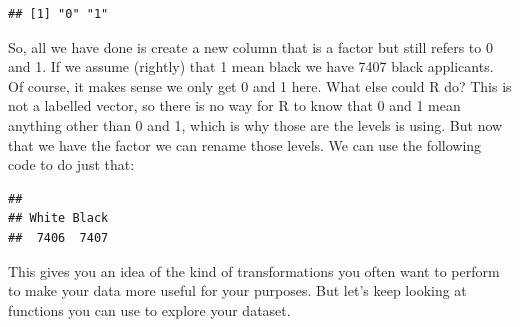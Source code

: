 \documentclass[
]{book}
\newenvironment{Shaded}{\begin{snugshade}}{\end{snugshade}}
\newcommand{\CommentTok}[1]{\textcolor[rgb]{0.56,0.35,0.01}{\textit{#1}}}
\newcommand{\FunctionTok}[1]{\textcolor[rgb]{0.00,0.00,0.00}{#1}}
\newcommand{\NormalTok}[1]{#1}
\newcommand{\OtherTok}[1]{\textcolor[rgb]{0.56,0.35,0.01}{#1}}
\newcommand{\SpecialCharTok}[1]{\textcolor[rgb]{0.00,0.00,0.00}{#1}}
\newcommand{\StringTok}[1]{\textcolor[rgb]{0.31,0.60,0.02}{#1}}
\begin{document}
\begin{Shaded}
\end{Shaded}

\begin{verbatim}
## [1] "0" "1"
\end{verbatim}

So, all we have done is create a new column that is a factor but still refers to 0 and 1. If we assume (rightly) that 1 mean black we have 7407 black applicants. Of course, it makes sense we only get 0 and 1 here. What else could R do? This is not a labelled vector, so there is no way for R to know that 0 and 1 mean anything other than 0 and 1, which is why those are the levels is using. But now that we have the factor we can rename those levels. We can use the following code to do just that:

\begin{Shaded}
\end{Shaded}

\begin{verbatim}
## 
## White Black 
##  7406  7407
\end{verbatim}

This gives you an idea of the kind of transformations you often want to perform to make your data more useful for your purposes. But let's keep looking at functions you can use to explore your dataset.
\end{document}
